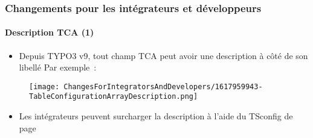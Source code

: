 %

\begin{frame}[fragile]
	\frametitle{Changements pour les intégrateurs et développeurs}
	\framesubtitle{Description TCA (1)}

	\begin{itemize}
		\item Depuis TYPO3 v9, tout champ TCA peut avoir une description à côté
			de son libellé\newline
			Par exemple~:
	\end{itemize}
	\begin{figure}
		\texttt{[image: ChangesForIntegratorsAndDevelopers/1617959943-TableConfigurationArrayDescription.png]}
	\end{figure}
	\vspace{-0.4cm}
	\begin{itemize}
		\item Les intégrateurs peuvent surcharger la description à l'aide du TSconfig de page
	\end{itemize}
\end{frame}


